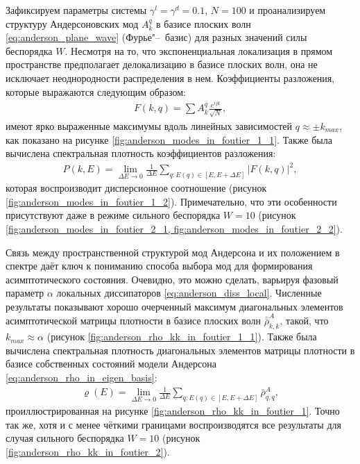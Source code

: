 Зафиксируем параметры системы \(\gamma^l = \gamma^d = 0.1\), \(N=100\) и проанализируем структуру Андерсоновских мод \(A^{q}_k\) в базисе плоских волн \cref{eq:anderson_plane_wave} (Фурье"--~базис) для разных значений силы беспорядка \(W\).
Несмотря на то, что экспоненциальная локализация в прямом пространстве предполагает делокализацию в базисе плоских волн, она не исключает неоднородности распределения в нем.
Коэффициенты разложения, которые выражаются следующим образом:
\begin{equation}
\label{eq:anderson_modes_in_plane_wave}
\begin{gathered}
F(k,q) = \sum A^q_k \frac{e^{i j k}}{\sqrt{N}},
\end{gathered}
\end{equation}
имеют ярко выраженные максимумы вдоль линейных зависимостей \(q \approx \pm k_{max}\), как показано на рисунке \cref{fig:anderson_modes_in_foutier_1_1}.
Также была вычислена спектральная плотность коэффициентов разложения:
\begin{equation}
\label{eq:anderson_modes_in_plane_wave_density}
\begin{gathered}
P(k,E) = \lim_{\Delta E \to 0} \frac{1}{\Delta E} \sum_{q:E(q) \in [E, E + \Delta E]} \left| F(k,q) \right|^2 ,
\end{gathered}
\end{equation}
которая воспроизводит дисперсионное соотношение (рисунок \cref{fig:anderson_modes_in_foutier_1_2}).
Примечательно, что эти особенности присутствуют даже в режиме сильного беспорядка \(W=10\) (рисунок \cref{fig:anderson_modes_in_foutier_2_1, fig:anderson_modes_in_foutier_2_2}).

Связь между пространственной структурой мод Андерсона и их положением в спектре даёт ключ к пониманию способа выбора мод для формирования асимптотического состояния. Очевидно, это можно сделать, варьируя фазовый параметр \(\alpha\) локальных диссипаторов \cref{eq:anderson_diss_local}.
Численные результаты показывают хорошо очерченный максимум диагональных элементов асимптотической матрицы плотности в базисе плоских волн \(\bar{\bar{\rho}}^A_{k,k}\), такой, что \(k_{max} \approx \alpha\) (рисунок \cref{fig:anderson_rho_kk_in_foutier_1_1}). Также была вычислена спектральная плотность диагональных элементов матрицы плотности в базисе собственных состояний модели Андерсона \cref{eq:anderson_rho_in_eigen_basis}:
\begin{equation}
\label{eq:anderson_rho_kk_density}
\begin{gathered}
\varrho(E) = \lim_{\Delta E \to 0} \frac{1}{\Delta E} \sum_{q:E(q) \in [E, E + \Delta E]} \bar{\rho}^A_{q,q},
\end{gathered}
\end{equation}
проиллюстрированная на рисунке \cref{fig:anderson_rho_kk_in_foutier_1}. Точно так же, хотя и с менее чёткими границами воспроизводятся все результаты для случая сильного беспорядка \(W=10\) (рисунок \cref{fig:anderson_rho_kk_in_foutier_2}).

